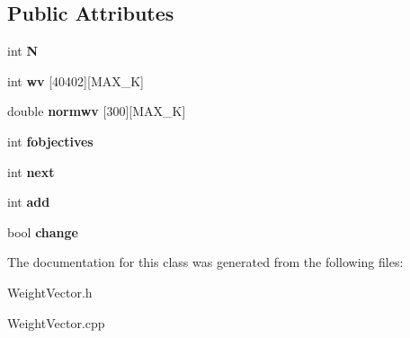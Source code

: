 \subsection*{Public Attributes}
\begin{DoxyCompactItemize}
\item 
\hypertarget{class_weight_vector_adefc9725ce2b610dabd648d7f8df5ea1}{}int {\bfseries N}\label{class_weight_vector_adefc9725ce2b610dabd648d7f8df5ea1}

\item 
\hypertarget{class_weight_vector_ae26576d53e5b5ef813d4ae4c7ee30a17}{}int {\bfseries wv} \mbox{[}40402\mbox{]}\mbox{[}M\+A\+X\+\_\+\+K\mbox{]}\label{class_weight_vector_ae26576d53e5b5ef813d4ae4c7ee30a17}

\item 
\hypertarget{class_weight_vector_a96f6120e47ec6a69ea8fb44354c7d6c1}{}double {\bfseries normwv} \mbox{[}300\mbox{]}\mbox{[}M\+A\+X\+\_\+\+K\mbox{]}\label{class_weight_vector_a96f6120e47ec6a69ea8fb44354c7d6c1}

\item 
\hypertarget{class_weight_vector_a43698d77052d7968c3cb639274e3ce6b}{}int {\bfseries fobjectives}\label{class_weight_vector_a43698d77052d7968c3cb639274e3ce6b}

\item 
\hypertarget{class_weight_vector_ae68a12dd1389aa917474c2c0554b162d}{}int {\bfseries next}\label{class_weight_vector_ae68a12dd1389aa917474c2c0554b162d}

\item 
\hypertarget{class_weight_vector_a47d64987ec0b01c88558dc32d96bc2c0}{}int {\bfseries add}\label{class_weight_vector_a47d64987ec0b01c88558dc32d96bc2c0}

\item 
\hypertarget{class_weight_vector_ac09f8bf08bb12a285f9d4107de97794a}{}bool {\bfseries change}\label{class_weight_vector_ac09f8bf08bb12a285f9d4107de97794a}

\end{DoxyCompactItemize}


The documentation for this class was generated from the following files\+:\begin{DoxyCompactItemize}
\item 
Weight\+Vector.\+h\item 
Weight\+Vector.\+cpp\end{DoxyCompactItemize}
